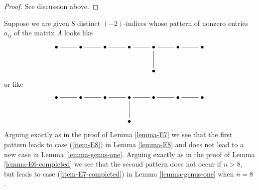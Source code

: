\documentclass{stacks-project}
\theoremstyle{plain}
\theoremstyle{definition}
\theoremstyle{remark}
\numberwithin{equation}{subsection}
\begin{document}
\begin{proof}
See discussion above.
\end{proof}

\noindent
Suppose we are given $8$ distinct $(-2)$-indices whose pattern
of nonzero entries $a_{ij}$ of the matrix $A$ looks like
$$
\xymatrix{
\bullet \ar@{-}[r] & \bullet \ar@{-}[r] & \bullet \ar@{-}[r] &
\bullet \ar@{-}[r] & \bullet \ar@{-}[r] \ar@{-}[d] &
\bullet \ar@{-}[r] & \bullet \\
& & & & \bullet
}
$$
or like
$$
\xymatrix{
\bullet \ar@{-}[r] & \bullet \ar@{-}[r] & \bullet \ar@{-}[r] &
\bullet \ar@{-}[r] \ar@{-}[d] & \bullet \ar@{-}[r] &
\bullet \ar@{-}[r] & \bullet \\
& & & \bullet
}
$$
Arguing exactly as in the proof of Lemma \ref{lemma-E7}
we see that the first pattern leads to case
(\ref{item-E8}) in Lemma \ref{lemma-E8}
and does not lead to a new case in Lemma \ref{lemma-genus-one}.
Arguing exactly as in the proof of Lemma \ref{lemma-E6-completed}
we see that the second pattern does not occur if
$n > 8$, but leads to case (\ref{item-E7-completed})
in Lemma \ref{lemma-genus-one} when $n = 8$.
\end{document}
